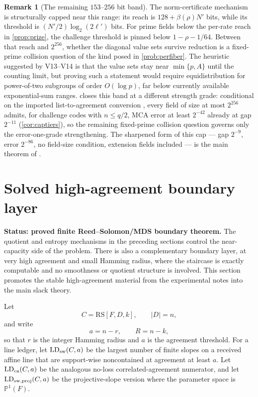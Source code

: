 \documentclass[11pt]{article}
\theoremstyle{definition}
\newtheorem{remark}[remark]{Remark}
\newcommand{\RS}{\mathrm{RS}}
\newcommand{\Acl}{A}
\begin{document}
\begin{remark}[The remaining $153$--$256$ bit band]\label{rem:capstone}
The norm-certificate mechanism is structurally capped near this range: its reach is $128+\beta(\rho)N'$ bits, while its threshold is $(N'/2)\log_2(2\ell')$ bits.  For prime fields below the per-rate reach in \cref{prop:prize}, the challenge threshold is pinned below $1-\rho-1/64$.  Between that reach and $2^{256}$, whether the diagonal value sets survive reduction is a fixed-prime collision question of the kind posed in \cref{prob:perfiber}.  The heuristic suggested by V13--V14 is that the value sets stay near $\min\{p,\Acl\}$ until the counting limit, but proving such a statement would require equidistribution for power-of-two subgroups of order $O(\log p)$, far below currently available exponential-sum ranges.   closes this band at a different strength grade: conditional on the imported list-to-agreement conversion \cite{CS25,ABF26}, every field of size at most $2^{256}$ admits, for challenge codes with $n\le q/2$, MCA error at least $2^{-42}$ already at gap $2^{-11}$ (\cref{cor:captiers}), so the remaining fixed-prime collision question governs only the error-one-grade strengthening.  The sharpened form of this cap --- gap $2^{-9}$, error $2^{-86}$, no field-size condition, extension fields included --- is the main theorem of \cite{UniversalCap}.
\end{remark}



\section{Solved high-agreement boundary layer}\label{sec:solved-high-agreement-boundary}

\textbf{Status: proved finite Reed--Solomon/MDS boundary theorem.}
The quotient and entropy mechanisms in the preceding sections control the near-capacity
side of the problem.  There is also a complementary boundary layer, at very high
agreement and small Hamming radius, where the staircase is exactly computable and no
smoothness or quotient structure is involved.  This section promotes the stable
high-agreement material from the experimental notes into the main slack theory.

Let
\[
        C=\RS[F,D,k],\qquad |D|=n,
\]
and write
\[
        a=n-r,
        \qquad R=n-k,
\]
so that \(r\) is the integer Hamming radius and \(a\) is the agreement threshold.
For a line ledger, let \(\operatorname{LD}_{\rm sw}(C,a)\) be the largest number of
finite slopes on a received affine line that are support-wise noncontained at
agreement at least \(a\).  Let \(\operatorname{LD}_{\rm ca}(C,a)\) be the analogous
no-loss correlated-agreement numerator, and let
\(\operatorname{LD}_{\rm sw,proj}(C,a)\) be the projective-slope version where the
parameter space is \(\mathbb P^1(F)\).
\end{document}
